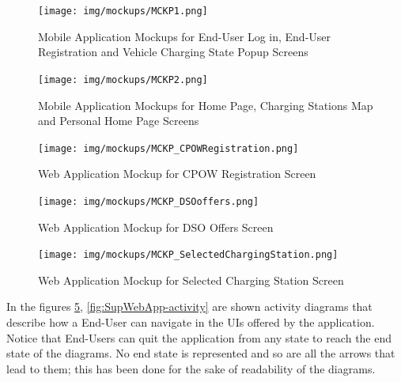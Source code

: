 \documentclass[a4paper]{report}
\begin{document}
\begin{figure}[hp]
\centering
\texttt{[image: img/mockups/MCKP1.png]}
\caption{Mobile Application Mockups for End-User Log in, End-User Registration and Vehicle Charging State Popup Screens}
\label{fig:MobileApp-activity}
\end{figure}

\begin{figure}[hp]
\centering
\texttt{[image: img/mockups/MCKP2.png]}
\caption{Mobile Application Mockups for Home Page, Charging Stations Map and Personal Home Page Screens}
\label{fig:MobileApp-activity}
\end{figure}

\begin{figure}[hp]
\centering
\texttt{[image: img/mockups/MCKP\_CPOWRegistration.png]}
\caption{Web Application Mockup for CPOW Registration Screen}
\label{fig:MobileApp-activity}
\end{figure}


\begin{figure}[hp]
\centering
\texttt{[image: img/mockups/MCKP\_DSOoffers.png]}
\caption{Web Application Mockup for DSO Offers Screen}
\label{fig:MobileApp-activity}
\end{figure}


\begin{figure}[hp]
\centering
\texttt{[image: img/mockups/MCKP\_SelectedChargingStation.png]}
\caption{Web Application Mockup for Selected Charging Station Screen}
\label{fig:MobileApp-activity}
\end{figure}

In the figures \ref{fig:MobileApp-activity}, \ref{fig:SupWebApp-activity}  are shown activity diagrams that describe how a End-User can navigate in the UIs offered by the application. Notice that  End-Users can quit the application from any state to reach the end state of the diagrams. No end state is represented and so are all the arrows that lead to them; this has been done for the sake of readability of the diagrams.

\end{document}
